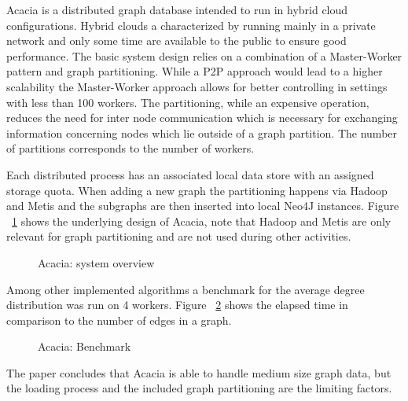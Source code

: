 \documentclass{sig-alternate}
\begin{document}
Acacia \cite{dayarathna2014towards} is a distributed graph database intended to run in hybrid cloud configurations.
Hybrid clouds a characterized by running mainly in a private network and only
some time are available to the public to ensure good performance.
The basic system design relies on a combination of a Master-Worker pattern 
and graph partitioning. While a P2P approach would lead to a higher scalability
the Master-Worker approach allows for better controlling in settings with less than 100 workers.
The partitioning, while an expensive operation, reduces the need for inter node communication
which is necessary for exchanging information concerning nodes which lie outside of a graph partition.
The number of partitions corresponds to the number of workers.

Each distributed process has an associated local data store with an assigned storage quota.
When adding a new graph the partitioning happens via Hadoop and Metis and the subgraphs are then inserted into local
Neo4J instances. Figure ~\ref{fig:distgraph} shows the underlying design of Acacia, note that Hadoop and Metis 
are only relevant for graph partitioning and are not used during other 
activities.

\begin{figure}[H]
\centering
{}
\caption{Acacia: system overview \cite{dayarathna2014towards}}
\label{fig:distgraph}
\end{figure}

Among other implemented algorithms a benchmark for the average degree distribution was run on 4 workers.
Figure ~\ref{fig:distgraphperf} shows the elapsed time in comparison to the number of edges in a graph.

\begin{figure}[H]
\centering
{}
\caption{Acacia: Benchmark \cite{dayarathna2014towards}}
\label{fig:distgraphperf}
\end{figure}

The paper concludes that Acacia is able to handle medium size graph data, but the loading process and 
the included graph partitioning are the limiting factors.




%

%
%
\end{document}
